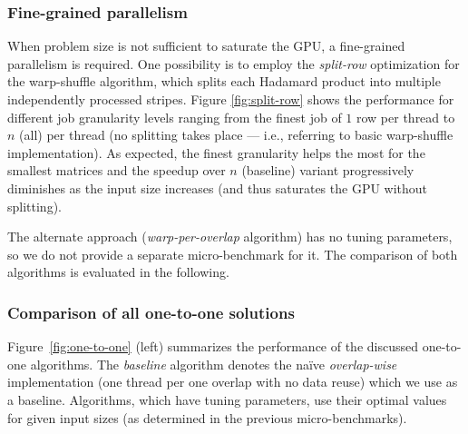 \subsubsection{Fine-grained parallelism}

When problem size is not sufficient to saturate the GPU, a fine-grained parallelism is required. One possibility is to employ the \emph{split-row} optimization for the warp-shuffle algorithm, which splits each Hadamard product into multiple independently processed stripes. Figure \ref{fig:split-row} shows the performance for different job granularity levels ranging from the finest job of $1$ row per thread to $n$ (all) per thread (no splitting takes place --- i.e., referring to basic warp-shuffle implementation). As expected, the finest granularity helps the most for the smallest matrices and the speedup over $n$ (baseline) variant progressively diminishes as the input size increases (and thus saturates the GPU without splitting).

The alternate approach (\emph{warp-per-overlap} algorithm) has no tuning parameters, so we do not provide a separate micro-benchmark for it. The comparison of both algorithms is evaluated in the following.

\subsubsection{Comparison of all one-to-one solutions}

Figure~\ref{fig:one-to-one} (left) summarizes the performance of the discussed one-to-one algorithms. The \emph{baseline} algorithm denotes the na\"{i}ve \emph{overlap-wise} implementation (one thread per one overlap with no data reuse) which we use as a baseline. Algorithms, which have tuning parameters, use their optimal values for given input sizes (as determined in the previous micro-benchmarks).

